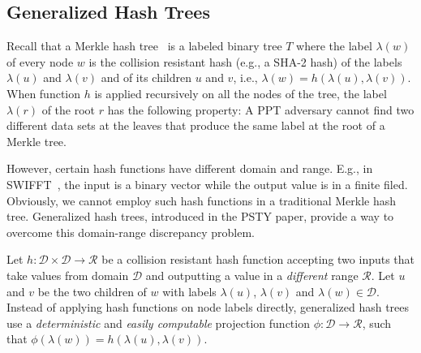 \subsection{Generalized Hash Trees}
Recall that a Merkle hash tree~\cite{m-cds-89} is a labeled binary tree $T$ where the label $\lambda(w)$ of every node $w$ is the collision resistant hash (e.g., a SHA-2 hash) of the labels $\lambda(u)$ and $\lambda(v)$ and of its children $u$ and $v$, i.e., $\lambda(w)=h(\lambda(u),\lambda(v))$. When function $h$ is applied recursively on all the nodes of the tree, the label $\lambda(r)$ of the root $r$ has the following property: A PPT adversary cannot find two different data sets at the leaves that produce the same label at the root of a Merkle tree.

However, certain hash functions have different domain and range. E.g., in SWIFFT~\cite{swifft}, the input is a binary vector while the output value is in a finite filed. Obviously, we cannot employ such hash functions in a traditional Merkle hash tree. Generalized hash trees, introduced in the PSTY paper, provide a way to overcome this domain-range discrepancy problem.







Let $h: \mathcal{D}\times \mathcal{D}\rightarrow \mathcal{R}$ be a collision resistant hash function accepting two inputs that take values from domain $\mathcal{D}$ and outputting a value in a \emph{different} range $\mathcal{R}$. Let $u$ and $v$ be the two children of $w$ with labels $\lambda(u)$, $\lambda(v)$ and $\lambda(w) \in \mathcal{D}$. Instead of applying hash functions on node labels directly, generalized hash trees use a \emph{deterministic} and \emph{easily computable} projection function $\phi: \mathcal{D}\rightarrow \mathcal{R}$, such that $\phi(\lambda(w))=h(\lambda(u),\lambda(v))$.



